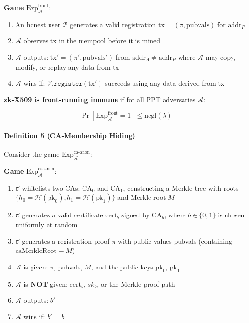 \documentclass[11pt, a4paper]{article}
\begin{document}
\begin{mdframed}[linewidth=0.5pt, innertopmargin=6pt, innerbottommargin=6pt]
\small
\textbf{Game} $\text{Exp}_{\mathcal{A}}^{\text{front}}$:
\begin{enumerate}[nosep,leftmargin=1.5em]
\item An honest user $\mathcal{P}$ generates a valid registration $\text{tx} = (\pi, \text{pubvals})$ for $\text{addr}_P$
\item $\mathcal{A}$ observes tx in the mempool before it is mined
\item $\mathcal{A}$ outputs: $\text{tx}' = (\pi', \text{pubvals}')$ from $\text{addr}_A \neq \text{addr}_P$ where $\mathcal{A}$ may copy, modify, or replay any data from tx
\item $\mathcal{A}$ wins if: $\mathcal{V}.\texttt{register}(\text{tx}')$ succeeds using any data derived from tx
\end{enumerate}
\end{mdframed}

\textbf{zk-X509 is front-running immune} if for all PPT adversaries
\(\mathcal{A}\):

\[\Pr[\text{Exp}_{\mathcal{A}}^{\text{front}} = 1] \leq \text{negl}(\lambda)\]

\paragraph{Definition 5 (CA-Membership
Hiding)}\label{definition-5-ca-membership-hiding}

Consider the game \(\text{Exp}_{\mathcal{A}}^{\text{ca-anon}}\):

\begin{mdframed}[linewidth=0.5pt, innertopmargin=6pt, innerbottommargin=6pt]
\small
\textbf{Game} $\text{Exp}_{\mathcal{A}}^{\text{ca-anon}}$:
\begin{enumerate}[nosep,leftmargin=1.5em]
\item $\mathcal{C}$ whitelists two CAs: $\text{CA}_0$ and $\text{CA}_1$, constructing a Merkle tree with roots $\{h_0 = \mathcal{H}(\text{pk}_0), h_1 = \mathcal{H}(\text{pk}_1)\}$ and Merkle root $M$
\item $\mathcal{C}$ generates a valid certificate $\text{cert}_b$ signed by $\text{CA}_b$, where $b \in \{0, 1\}$ is chosen uniformly at random
\item $\mathcal{C}$ generates a registration proof $\pi$ with public values pubvals (containing $\text{caMerkleRoot} = M$)
\item $\mathcal{A}$ is given: $\pi$, pubvals, $M$, and the public keys $\text{pk}_0$, $\text{pk}_1$
\item $\mathcal{A}$ is \textbf{NOT} given: $\text{cert}_b$, $sk_b$, or the Merkle proof path
\item $\mathcal{A}$ outputs: $b'$
\item $\mathcal{A}$ wins if: $b' = b$
\end{enumerate}
\end{mdframed}
\end{document}
